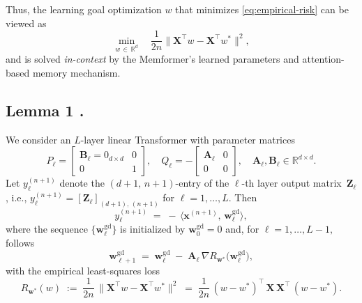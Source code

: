 Thus, the learning goal optimization $w$ that minimizes \eqref{eq:empirical-risk} can be viewed as
\[
  \min_{w \,\in\, \mathbb{R}^d} \quad 
  \frac{1}{2n}\|\mathbf{X}^\top w - \mathbf{X}^\top w^*\|^2,
\]
and is solved \emph{in-context} by the Memformer's learned parameters and attention-based memory mechanism.


\subsection{Lemma 1 \cite{ahn2024transformers}.}
We consider an $L$-layer linear Transformer with parameter matrices 
\[
P_\ell = 
\begin{bmatrix}
\mathbf{B}_\ell = 0_{d \times d} & 0 \\
0 & 1
\end{bmatrix},
\quad
Q_\ell = 
-\begin{bmatrix}
\mathbf{A}_\ell & 0 \\
0 & 0
\end{bmatrix}, 
\quad \mathbf{A}_\ell, \mathbf{B}_\ell \in \mathbb{R}^{d \times d}.
\]
Let $y_\ell^{(n+1)}$ denote the $(d+1,\,n+1)$-entry of the $\ell$-th layer output matrix~$\mathbf{Z}_\ell$, i.e., 
\(
   y_\ell^{(n+1)} = [\mathbf{Z}_\ell]_{(d+1),\,(n+1)}
\)
for $\ell = 1, \dots, L$. Then
\[
   y_\ell^{(n+1)} \;=\; -\,\bigl\langle \mathbf{x}^{(n+1)}, \,\mathbf{w}_\ell^{\mathrm{gd}}\bigr\rangle,
\]
where the sequence $\{\mathbf{w}_\ell^{\mathrm{gd}}\}$ is initialized by $\mathbf{w}_{0}^{\mathrm{gd}} = 0$ and, for $\ell = 1, \dots, L - 1,$ follows
\[
   \mathbf{w}_{\ell+1}^{\mathrm{gd}}
   \;=\;
   \mathbf{w}_{\ell}^{\mathrm{gd}}
   \;-\;
   \mathbf{A}_\ell 
   \,\nabla R_{\mathbf{w}^*}\bigl(\mathbf{w}_{\ell}^{\mathrm{gd}}\bigr),
\]
with the empirical least-squares loss 
\[
   R_{\mathbf{w}^*}(w) 
   \;:=\; 
   \frac{1}{2n}\,\bigl\|\mathbf{X}^\top w - \mathbf{X}^\top w^*\bigr\|^2
   \;=\;
   \frac{1}{2n}\,
   (w - w^*)^\top \,\mathbf{X}\,\mathbf{X}^\top \,(w - w^*).
\]
